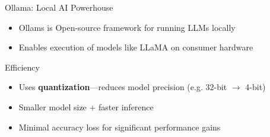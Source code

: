 \documentclass[aspectratio=169]{beamer}
\begin{document}
\begin{frame}{Ollama: Local AI Powerhouse}
\begin{itemize}
    \item Ollams is Open-source framework for running LLMs locally
    \item Enables execution of models like LLaMA on consumer hardware
\end{itemize}

\begin{block}{Efficiency}
\begin{itemize}
    \item Uses \textbf{quantization}—reduces model precision (e.g. 32-bit $\rightarrow$ 4-bit)
    \item Smaller model size + faster inference
    \item Minimal accuracy loss for significant performance gains
\end{itemize}
\end{block}


\end{frame}
\end{document}
